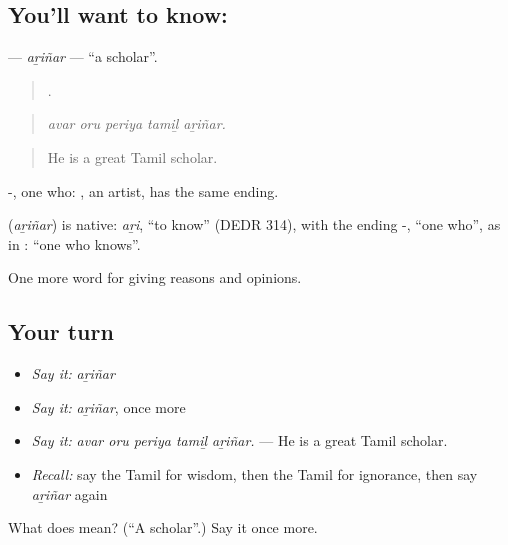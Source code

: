 \subsection*{You'll want to know: }
\textbf{} — \emph{aṟiñar} — \textquotedblleft{}a scholar\textquotedblright{}.

\begin{quote}
    .
\end{quote}

\begin{quote}
\emph{avar oru periya tamiḻ aṟiñar.}
\end{quote}

\begin{quote}
He is a great Tamil scholar.
\end{quote}

-, one who: , an artist, has the same ending.

\begin{cousinweb}
\textbf{} (\emph{aṟiñar}) is native: \emph{aṟi}, \textquotedblleft{}to know\textquotedblright{} (DEDR 314), with the ending -, \textquotedblleft{}one who\textquotedblright{}, as in : \textquotedblleft{}one who knows\textquotedblright{}.
\end{cousinweb}

\begin{grammarlens}[title={What you've built}]
One more word for giving reasons and opinions.
\end{grammarlens}

\subsection*{Your turn}
\begin{itemize}
\raggedright
  \item \emph{Say it:} \emph{aṟiñar}
  \item \emph{Say it:} \emph{aṟiñar}, once more
  \item \emph{Say it:} \emph{avar oru periya tamiḻ aṟiñar.} — He is a great Tamil scholar.
  \item \emph{Recall:} say the Tamil for wisdom, then the Tamil for ignorance, then say \emph{aṟiñar} again
\end{itemize}

\begin{tcolorbox}[breakable,colback=teal!4,colframe=teal!35!black,title={Before you move on}]
What does  mean? (\textquotedblleft{}A scholar\textquotedblright{}.) Say it once more.
\end{tcolorbox}
